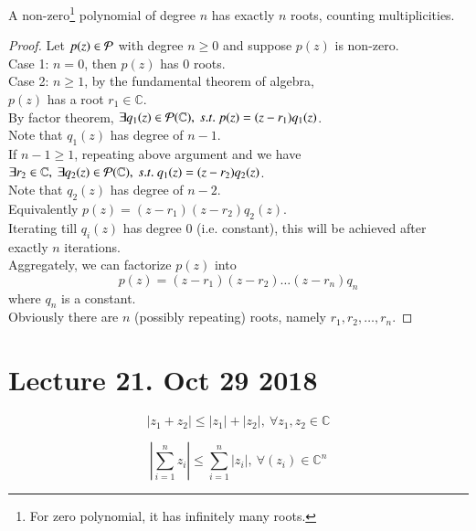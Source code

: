 \documentclass[11pt]{article}
\begin{document}
	\begin{theorem}
		A non-zero\footnote{For zero polynomial, it has infinitely many roots.} polynomial of degree $n$ has exactly $n$ roots, counting multiplicities.
	\end{theorem}
	\begin{proof}
		Let $p(z) \in \mathcal{{P}}$ with degree $n \geq 0$ and suppose $p(z)$ is non-zero. \\
		Case 1: $n=0$, then $p(z)$ has 0 roots. \\
		Case 2: $n \geq 1$, by the fundamental theorem of algebra, \\
		$p(z)$ has a root $r_1 \in \mathbb{C}$. \\
		By factor theorem, $\exists q_1(z) \in \mathcal{{P}}(\mathbb{C}),\ s.t.\ p(z) = (z-r_1)q_1(z)$. \\
		Note that $q_1(z)$ has degree of $n-1$. \\
		If $n-1 \geq 1$, repeating above argument and we have \\
		$\exists r_2 \in \mathbb{C},\ \exists q_2(z) \in \mathcal{{P}}(\mathbb{C}),\ s.t.\ q_1(z) = (z-r_2)q_2(z)$. \\
		Note that $q_2(z)$ has degree of $n-2$. \\
		Equivalently $p(z) = (z-r_1)(z-r_2)q_2(z)$. \\
		Iterating till $q_i(z)$ has degree 0 (i.e. constant), this will be achieved after exactly $n$ iterations. \\
		Aggregately, we can factorize $p(z)$ into 
		\[
			p(z) = (z-r_1)(z-r_2)\dots(z-r_n)q_n
		\]
		where $q_n$ is a constant. \\
		Obviously there are $n$ (possibly repeating) roots, namely $r_1, r_2, \dots, r_n$.
	\end{proof}

	\section{Lecture 21. Oct 29 2018}
		\begin{lemma}
			\[
				|z_1 + z_2| \leq |z_1| + |z_2|,\ \forall z_1, z_2 \in \mathbb{C}
			\]
		\end{lemma}

		\begin{lemma}
			\[
				| \sum_{i=1}^{n} {z_i} | \leq \sum_{i=1}^{n} |z_i|,\ \forall (z_i) \in \mathbb{C}^n
			\]
		\end{lemma}
\end{document}
